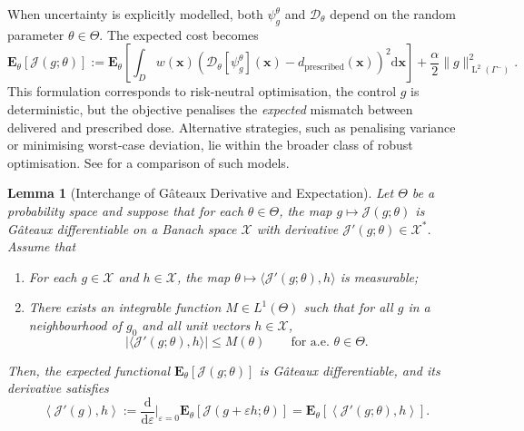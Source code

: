 \documentclass{amsart}
\newcommand{\dd}{{\mathrm d}}
\theoremstyle{plain}
\newtheorem{lemma}[theorem]{Lemma}
\renewcommand{\vec}[1]{\ensuremath{\boldsymbol{#1}}}
\newcommand{\leb}{\text{Leb}}
\newcommand{\LL}{\ensuremath{\operatorname L}\xspace}
\renewcommand{\leb}[1]{\ensuremath{\LL^{#1}}}
\begin{document}
When uncertainty is explicitly modelled, both $\psi_g^\theta$ and
$\mathcal{D}_\theta$ depend on the random parameter $\theta \in
\Theta$. The expected cost becomes
\begin{equation}
  \label{eq:expectedcost}
  \mathbf{E}_\theta[\mathcal{J}(g; \theta)] :=
  \mathbf{E}_\theta \left[ \int_D w(\vec{x}) \left( \mathcal{D}_\theta[\psi_g^\theta](\vec{x}) - d_{\text{prescribed}}(\vec{x}) \right)^2 \dd \vec{x} \right]
  + \frac{\alpha}{2} \| g \|^2_{\leb{2}(\Gamma^-)}.
\end{equation}
This formulation corresponds to risk-neutral optimisation, the control
$g$ is deterministic, but the objective penalises the \emph{expected}
mismatch between delivered and prescribed dose. Alternative
strategies, such as penalising variance or minimising worst-case
deviation, lie within the broader class of robust optimisation. See
\cite{georgiou2025scotty} for a comparison of such models.

\begin{lemma}[Interchange of G\^ateaux Derivative and Expectation]
  \label{lemma:interchange}
  Let $\Theta$ be a probability space and suppose that for each
  $\theta \in \Theta$, the map $g \mapsto \mathcal{J}(g; \theta)$ is
  G\^ateaux differentiable on a Banach space $\mathcal{X}$ with
  derivative $\mathcal{J}'(g; \theta) \in \mathcal{X}^*$. Assume that
  \begin{enumerate}
    \item For each $g \in \mathcal{X}$ and $h \in \mathcal{X}$, the map
    $\theta \mapsto \langle \mathcal{J}'(g; \theta), h \rangle$ is
    measurable;
    \item There exists an integrable function $M \in L^1(\Theta)$ such
    that for all $g$ in a neighbourhood of $g_0$ and all unit vectors $h \in \mathcal{X}$,
    \begin{equation}
      \left| \langle \mathcal{J}'(g; \theta), h \rangle \right| \leq M(\theta) \qquad \text{for a.e. } \theta \in \Theta.
    \end{equation}
  \end{enumerate}
  Then, the expected functional $\mathbf{E}_\theta[\mathcal{J}(g; \theta)]$ is Gâteaux differentiable, and its derivative satisfies
  \begin{equation}
    \left\langle \mathcal{J}'(g), h \right\rangle
    :=
    \frac{\dd}{\dd\varepsilon} \Big|_{\varepsilon = 0} \mathbf{E}_\theta[\mathcal{J}(g + \varepsilon h; \theta)]
    =
    \mathbf{E}_\theta \left[ \left\langle \mathcal{J}'(g; \theta), h \right\rangle \right].
  \end{equation}
\end{lemma}
\end{document}
